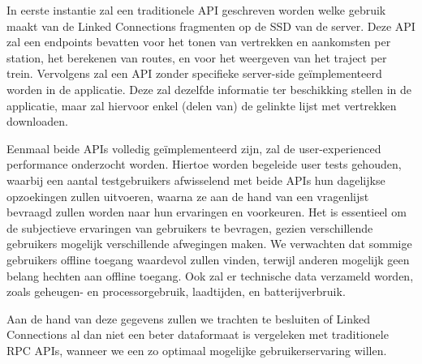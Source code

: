 In eerste instantie zal een traditionele API geschreven worden welke gebruik maakt van de Linked Connections fragmenten op de SSD van de server. Deze API zal een endpoints bevatten voor het tonen van vertrekken en aankomsten per station, het berekenen van routes, en voor het weergeven van het traject per trein. 
Vervolgens zal een API zonder specifieke server-side geïmplementeerd worden in de applicatie. Deze zal dezelfde informatie ter beschikking stellen in de applicatie, maar zal hiervoor enkel (delen van) de gelinkte lijst met vertrekken downloaden. 

Eenmaal beide APIs volledig geïmplementeerd zijn, zal de user-experienced performance onderzocht worden. Hiertoe worden begeleide user tests gehouden, waarbij een aantal testgebruikers afwisselend met beide APIs hun dagelijkse opzoekingen zullen uitvoeren, waarna ze aan de hand van een vragenlijst bevraagd zullen worden naar hun ervaringen en voorkeuren. Het is essentieel om de subjectieve ervaringen van gebruikers te bevragen, gezien verschillende gebruikers mogelijk verschillende afwegingen maken. We verwachten dat sommige gebruikers offline toegang waardevol zullen vinden, terwijl anderen mogelijk geen belang hechten aan offline toegang. Ook zal er technische data verzameld worden, zoals geheugen- en processorgebruik, laadtijden, en batterijverbruik. 

Aan de hand van deze gegevens zullen we trachten te besluiten of Linked Connections al dan niet een beter dataformaat is vergeleken met traditionele RPC APIs, wanneer we een zo optimaal mogelijke gebruikerservaring willen.